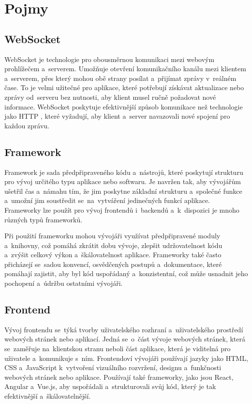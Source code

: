 \setlength{\headheight}{15.04742pt}
\section{Pojmy}

\subsection{WebSocket}\label{websocket} WebSocket \cite{websocket} je technologie pro obousměrnou komunikaci mezi webovým prohlížečem a~serverem. Umožňuje otevření komunikačního kanálu mezi klientem a~serverem, přes který mohou obě strany posílat a~přijímat zprávy v~reálném čase. To je velmi užitečné pro aplikace, které potřebují získávat aktualizace nebo zprávy od~serveru bez nutnosti, aby klient musel ručně požadovat nové informace. WebSocket poskytuje efektivnější způsob komunikace než technologie jako HTTP \cite{httpVSwebsocket}, které vyžadují, aby klient a~server navazovali nové spojení pro každou zprávu.
\newpage
\subsection{Framework} Framework je sada předpřipraveného kódu a~nástrojů, které poskytují strukturu pro vývoj určitého typu aplikace nebo softwaru. \cite{framework} Je navržen tak, aby vývojářům ušetřil čas a~námahu tím, že jim poskytne základní strukturu a~společné funkce a~umožní jim soustředit se~na~vytváření jedinečných funkcí aplikace. Frameworky lze použít pro vývoj frontendů i~backendů a~k~dispozici je mnoho různých typů frameworků. \par
Při použití frameworku mohou vývojáři využívat předpřipravené moduly a~knihovny, což pomáhá zkrátit dobu vývoje, zlepšit udržovatelnost kódu a~zvýšit celkový výkon a~škálovatelnost aplikace. Frameworky také často přicházejí se~sadou konvencí, osvědčených postupů a~dokumentace, které pomáhají zajistit, aby byl kód uspořádaný a~konzistentní, což může usnadnit jeho pochopení a~údržbu ostatními vývojáři.
\subsection{Frontend} Vývoj frontendu se~týká tvorby uživatelského rozhraní a~uživatelského prostředí webových stránek nebo aplikací. Jedná se~o~část vývoje webových stránek, která se~zaměřuje na~klientskou stranu neboli část aplikace, která je viditelná pro uživatele a~komunikuje s~ním. Frontendoví vývojáři používají jazyky jako HTML, CSS a~JavaScript k~vytvoření vizuálního rozvržení, designu a~funkčnosti webových stránek nebo aplikace. Používají také frameworky, jako jsou React, Angular a~Vue.js, aby uspořádali a~strukturovali svůj kód, který je tak efektivnější a~škálovatelnější.
